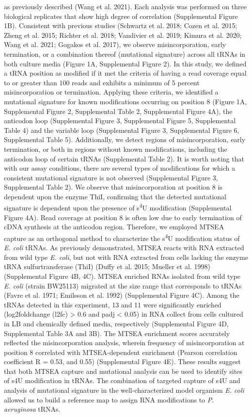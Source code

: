 \documentclass[times, twoside]{zHenriquesLab-StyleBioRxiv}
\begin{document}
 as previously described (Wang et al. 2021). Each analysis was performed on three biological replicates that show high degree of correlation (Supplemental Figure 1B). Consistent with previous studies (Schwartz et al. 2018; Cozen et al. 2015; Zheng et al. 2015; Richter et al. 2018; Vandivier et al. 2019; Kimura et al. 2020; Wang et al. 2021; Gogakos et al. 2017), we observe misincorporation, early termination, or a combination thereof (mutational signature) across all tRNAs in both culture media (Figure 1A, Supplemental Figure 2). In this study, we defined a tRNA position as modified if it met the criteria of having a read coverage equal to or greater than 100 reads and exhibits a minimum of 5 percent misincorporation or termination. Applying these criteria, we identified a mutational signature for known modifications occurring on position 8 (Figure 1A, Supplemental Figure 2, Supplemental Table 2, Supplemental Figure 4A), the anticodon loop (Supplemental Figure 3, Supplemental Figure 5, Supplemental Table 4) and the variable loop (Supplemental Figure 3, Supplemental Figure 6, Supplemental Table 5). Additionally, we detect regions of misincorporation, early termination, or both in regions without known modifications, including the anticodon loop of certain tRNAs (Supplemental Table 2). It is worth noting that with our assay conditions, there are several types of modifications for which a consistent mutational signature is not observed (Supplemental Figure 3, Supplemental Table 2). We observe that misincorporation at position 8 is dependent upon the enzyme ThiI, confirming that the detected mutational signature is dependent upon the presence of s\textsuperscript{4}U modification (Supplemental Figure 4A). Read coverage at position 8 is often low due to early termination of cDNA synthesis at the anticodon region. Therefore, we employed MTSEA capture as an orthogonal method to characterize the s\textsuperscript{4}U modification status of \textit{E. coli} tRNAs. As previously demonstrated, MTSEA reacts with RNA extracted from wild type \textit{E. coli}, but not with RNA extracted from cells lacking the enzyme tRNA sulfurtransferase (ThiI) (Duffy et al. 2015; Mueller et al. 1998) (Supplemental Figure 4B, 4C). MTSEA enriched RNAs isolated from wild type \textit{E. coli} (strain BW25113) migrated at the size range that corresponds to tRNAs (Favre et al. 1971; Emilsson et al. 1992) (Supplemental Figure 4C). Among the tRNAs detected in this experiment, 13 and 11 were significantly enriched (log2foldchange (l2fc) > 0.6 and padj < 0.05) in RNA collect from cells cultured in LB and chemically defined media, respectively (Supplemental Figure 4D, Supplemental Table 3A and 3B). The MTSEA enrichment scores accurately reflected the misincorporation analysis, wherein frequency of misincorporation at position 8 correlated with MTSEA-dependent enrichment (Pearson correlation coefficient R = 0.53, and 0.55) (Supplemental Figure 4E). These results suggest that both MTSEA capture and mutational analysis can be used to identify sites of s4U modification in tRNAs. The combination of targeted capture of s4U and analysis of mutational signature in the well-characterized model organism \textit{E. coli} allowed us to build a reference map to assign RNA modifications to \textit{P. aeruginosa} tRNAs. 
\end{document}

